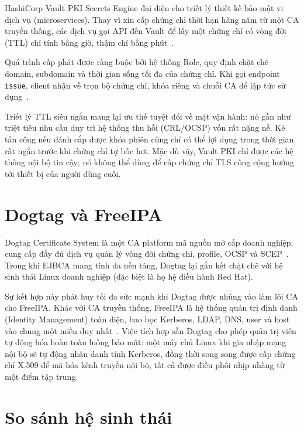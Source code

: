 HashiCorp Vault PKI Secrets Engine đại diện cho triết lý thiết kế bảo mật vi dịch vụ (microservices). Thay vì xin cấp chứng chỉ thời hạn hàng năm từ một CA truyền thống, các dịch vụ gọi API đến Vault để lấy một chứng chỉ có vòng đời (TTL) chỉ tính bằng giờ, thậm chí bằng phút~\cite{VaultPKI}.

Quá trình cấp phát được ràng buộc bởi hệ thống Role, quy định chặt chẽ domain, subdomain và thời gian sống tối đa của chứng chỉ. Khi gọi endpoint \texttt{issue}, client nhận về trọn bộ chứng chỉ, khóa riêng và chuỗi CA để lập tức sử dụng~\cite{VaultPKIQuickStart}.

Triết lý TTL siêu ngắn mang lại ưu thế tuyệt đối về mặt vận hành: nó gần như triệt tiêu nhu cầu duy trì hệ thống thu hồi (CRL/OCSP) vốn rất nặng nề. Kẻ tấn công nếu đánh cắp được khóa phiên cũng chỉ có thể lợi dụng trong thời gian rất ngắn trước khi chứng chỉ tự bốc hơi. Mặc dù vậy, Vault PKI chỉ được các hệ thống nội bộ tin cậy; nó không thể dùng để cấp chứng chỉ TLS công cộng hướng tới thiết bị của người dùng cuối.

\section{Dogtag và FreeIPA}
\label{sec:6.8}

Dogtag Certificate System là một CA platform mã nguồn mở cấp doanh nghiệp, cung cấp đầy đủ dịch vụ quản lý vòng đời chứng chỉ, profile, OCSP và SCEP~\cite{DogtagPKI}. Trong khi EJBCA mang tính đa nền tảng, Dogtag lại gắn kết chặt chẽ với hệ sinh thái Linux doanh nghiệp (đặc biệt là họ hệ điều hành Red Hat).

Sự kết hợp này phát huy tối đa sức mạnh khi Dogtag được nhúng vào làm lõi CA cho FreeIPA. Khác với CA truyền thống, FreeIPA là hệ thống quản trị định danh (Identity Management) toàn diện, bao bọc Kerberos, LDAP, DNS, user và host vào chung một miền duy nhất~\cite{FreeIPA}. Việc tích hợp sẵn Dogtag cho phép quản trị viên tự động hóa hoàn toàn luồng bảo mật: một máy chủ Linux khi gia nhập mạng nội bộ sẽ tự động nhận danh tính Kerberos, đồng thời song song được cấp chứng chỉ X.509 để mã hóa kênh truyền nội bộ, tất cả được điều phối nhịp nhàng từ một điểm tập trung.

\section{So sánh hệ sinh thái}
\label{sec:6.9}


